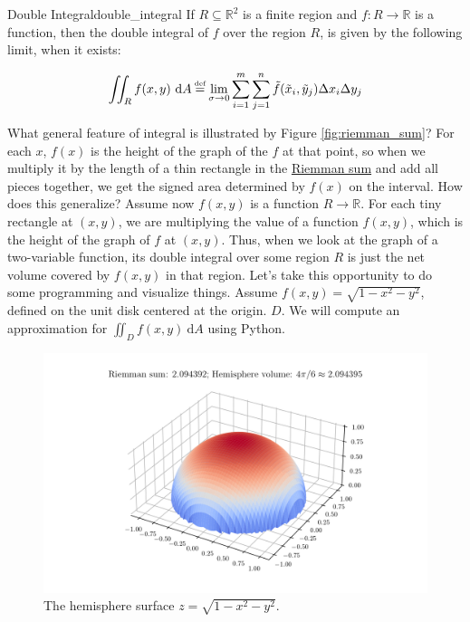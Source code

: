 \begin{adefinition}{Double Integral}{double_integral}
    If $R \subseteq \mathbb{R}^2$ is a finite region and $f: R \rightarrow \mathbb{R}$ is a function, then the double integral of $f$ over the region $R$, is given by the following limit, when it exists:
    
    \begin{equation*}
        \iint_R f(x,y) \ \mathrm{d} A \defeq \lim_{\sigma \rightarrow 0} \sum_{i=1}^{m} \sum_{j=1}^{n} \tilde{f}(\tilde{x}_i, \tilde{y}_j)\Delta x_i \Delta y_j
    \end{equation*}
    
\end{adefinition}

What general feature of integral is illustrated by Figure \ref{fig:riemman_sum}? For each $x$, $f(x)$ is the height of the graph of the $f$ at that point, so when we multiply it by the length of a thin rectangle in the \hyperref[eq:riemman_integral]{Riemman sum} and add all pieces together, we get the signed area determined by $f(x)$ on the interval. How does this generalize? Assume now $f(x,y)$ is a function $R\rightarrow \mathbb{R}$. For each tiny rectangle at $(x,y)$, we are multiplying the value of a function $f(x,y)$, which is the height of the graph of $f$ at $(x,y)$. Thus, when we look at the graph of a two-variable function, its double integral over some region $R$ is just the net volume covered by $f(x,y)$ in that region. Let's take this opportunity to do some programming and visualize things. Assume $f(x,y) = \sqrt{1-x^2-y^2}$, defined on the unit disk centered at the origin. $D$. We will compute an approximation for $\iint_D f(x,y) \ \mathrm{d} A$ using Python.

\begin{figure}[h!]
    \centering
    \includegraphics[width=\textwidth]{second_quarter/double_integral.png}
    \caption{The hemisphere surface $z = \sqrt{1-x^2-y^2}$.}
    \label{fig:hemisphere}
\end{figure}

